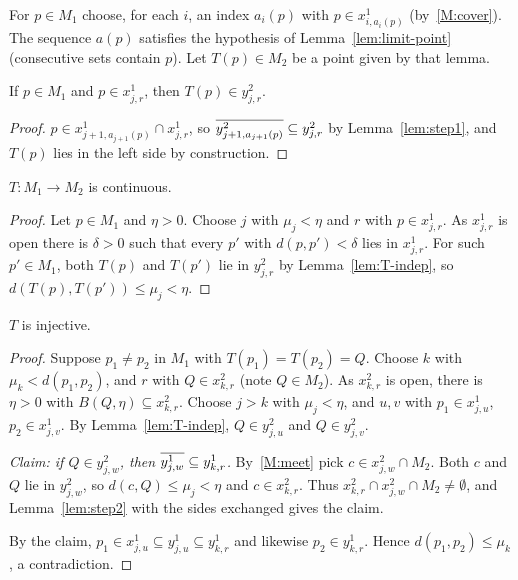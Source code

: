
For $p\in M_1$ choose, for each $i$, an index $a_i(p)$ with $p\in x^1_{i,a_i(p)}$ (by~\ref{M:cover}). The sequence $a(p)$
satisfies the hypothesis of Lemma~\ref{lem:limit-point} (consecutive sets contain $p$). Let $T(p)\in M_2$ be a point given by
that lemma.

\begin{lemma}\label{lem:T-indep}
If $p\in M_1$ and $p\in x^1_{j,r}$, then $T(p)\in y^2_{j,r}$.
\end{lemma}

\begin{proof}
$p\in x^1_{j+1,a_{j+1}(p)}\cap x^1_{j,r}$, so $\overline{y^2_{j+1,a_{j+1}(p)}}\subseteq y^2_{j,r}$ by Lemma~\ref{lem:step1}, and $T(p)$
lies in the left side by construction.
\end{proof}


\begin{lemma}[Step 5]\label{lem:T-cont}
$T\colon M_1\to M_2$ is continuous.
\end{lemma}

\begin{proof}
Let $p\in M_1$ and $\eta>0$. Choose $j$ with $\mu_j<\eta$ and $r$ with $p\in x^1_{j,r}$. As $x^1_{j,r}$ is open there is
$\delta>0$ such that every $p'$ with $d(p,p')<\delta$ lies in $x^1_{j,r}$. For such $p'\in M_1$, both $T(p)$ and $T(p')$ lie in
$y^2_{j,r}$ by Lemma~\ref{lem:T-indep}, so $d(T(p),T(p'))\le\mu_j<\eta$.
\end{proof}


\begin{lemma}[Step 6]\label{lem:T-inj}
$T$ is injective.
\end{lemma}

\begin{proof}
Suppose $p_1\neq p_2$ in $M_1$ with $T(p_1)=T(p_2)=Q$. Choose $k$ with $\mu_k<d(p_1,p_2)$, and $r$ with $Q\in x^2_{k,r}$ (note
$Q\in M_2$). As $x^2_{k,r}$ is open, there is $\eta>0$ with $B(Q,\eta)\subseteq x^2_{k,r}$. Choose $j>k$ with $\mu_j<\eta$, and $u,v$
with $p_1\in x^1_{j,u}$, $p_2\in x^1_{j,v}$. By Lemma~\ref{lem:T-indep}, $Q\in y^2_{j,u}$ and $Q\in y^2_{j,v}$.

\emph{Claim: if $Q\in y^2_{j,w}$, then $\overline{y^1_{j,w}}\subseteq y^1_{k,r}$.} By~\ref{M:meet} pick $c\in x^2_{j,w}\cap M_2$. Both $c$
and $Q$ lie in $y^2_{j,w}$, so $d(c,Q)\le\mu_j<\eta$ and $c\in x^2_{k,r}$. Thus $x^2_{k,r}\cap x^2_{j,w}\cap M_2\neq\emptyset$, and
Lemma~\ref{lem:step2} with the sides exchanged gives the claim.

By the claim, $p_1\in x^1_{j,u}\subseteq y^1_{j,u}\subseteq y^1_{k,r}$ and likewise $p_2\in y^1_{k,r}$. Hence $d(p_1,p_2)\le\mu_k$,
a contradiction.
\end{proof}

